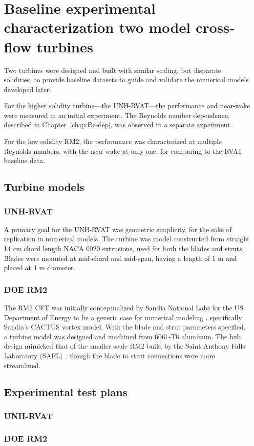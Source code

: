 \chapter{Baseline experimental characterization two model cross-flow turbines}

Two turbines were designed and built with similar scaling, but disparate
solidities, to provide baseline datasets to guide and validate the numerical
models developed later.

For the higher solidity turbine---the UNH-RVAT---the performance and near-wake
were measured in an initial experiment. The Reynolds number dependence,
described in Chapter~\ref{chap:Re-dep}, was observed in a separate experiment.

For the low solidity RM2, the performance was characterized at multiple Reynolds
numbers, with the near-wake at only one, for comparing to the RVAT baseline
data.

\section{Turbine models}

\subsection{UNH-RVAT}

A primary goal for the UNH-RVAT was geometric simplicity, for the sake of
replication in numerical models. The turbine was model constructed from straight
14 cm chord length NACA 0020 extrusions, used for both the blades and struts.
Blades were mounted at mid-chord and mid-span, having a length of 1 m and placed
at 1 m diameter.

\subsection{DOE RM2}

The RM2 CFT was initially conceptualized by Sandia National Labs for the US
Department of Energy to be a generic case for numerical modeling
\cite{Barone2011}, specifically Sandia's CACTUS vortex model. With the blade and
strut parameters specified, a turbine model was designed and machined from
6061-T6 aluminum. The hub design mimicked that of the smaller scale RM2 build by
the Saint Anthony Falls Laboratory (SAFL) \cite{Hill2014}, though the blade to
strut connections were more streamlined.

\section{Experimental test plans}

\subsection{UNH-RVAT}

\subsection{DOE RM2}